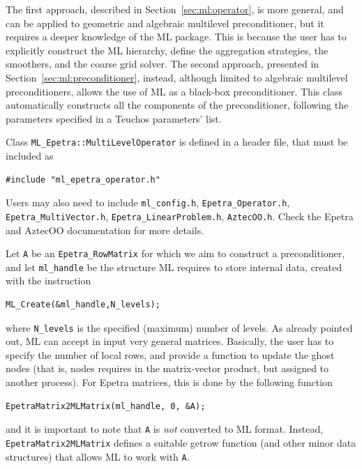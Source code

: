 The first approach, described in Section~\ref{sec:ml:operator}, is more
general, and can be applied to geometric and algebraic multilevel
preconditioner, but it requires a deeper knowledge of the ML package.
This is because the user has to explicitly construct the ML hierarchy,
define the aggregation strategies, the smoothers, and the coarse grid
solver. The second approach, presented in
Section~\ref{sec:ml:preconditioner}, instead, although limited to algebraic
multilevel preconditioners, allows the use of ML as a black-box
preconditioner. This class automatically constructs all the components
of the preconditioner, following the parameters specified in a Teuchos
parameters' list. 

\bigskip

Class \verb!ML_Epetra::MultiLevelOperator! is defined in a header file, that must
be included as
\begin{verbatim}
#include "ml_epetra_operator.h" 
\end{verbatim}
Users may also need to include \verb!ml_config.h!,
\verb!Epetra_Operator.h!, \verb!Epetra_MultiVector.h!,
\verb!Epetra_LinearProblem.h!,  \verb!AztecOO.h!. Check the Epetra and
AztecOO documentation for more details.

Let \verb!A! be an \verb!Epetra_RowMatrix! for which we aim to construct
a preconditioner, and let \verb!ml_handle! be the structure ML requires
to store internal data, created
with the instruction
\begin{verbatim}
ML_Create(&ml_handle,N_levels);
\end{verbatim}
where \verb!N_levels! is the specified (maximum) number of levels.  As
already pointed out, ML can accept in input very general matrices.
Basically, the user has to specify the number of local rows, and provide
a function to update the ghost nodes (that is, nodes requires in the
matrix-vector product, but assigned to another process). For Epetra
matrices, this is done by the following function
\begin{verbatim}
EpetraMatrix2MLMatrix(ml_handle, 0, &A);
\end{verbatim}
and it is important to note that \verb!A! is {\sl not} converted to ML
format. Instead, \verb!EpetraMatrix2MLMatrix! defines a suitable getrow
function (and other minor data structures) that allows ML to work with
\verb!A!.


